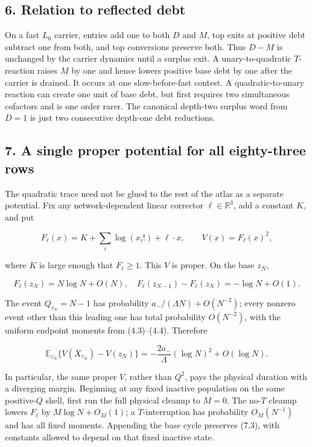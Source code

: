 \subsection{6. Relation to reflected
debt}

On a fast \(L_0\) carrier, entries add one to both \(D\) and \(M\), top
exits at positive debt subtract one from both, and top conversions
preserve both. Thus \(D-M\) is unchanged by the carrier dynamics until a
surplus exit. A unary-to-quadratic \(T\)-reaction raises \(M\) by one
and hence lowers positive base debt by one after the carrier is drained.
It occurs at one slow-before-fast contest. A quadratic-to-unary reaction
can create one unit of base debt, but first requires two simultaneous
cofactors and is one order rarer. The canonical depth-two surplus word
from \(D=1\) is just two consecutive depth-one debt reductions.

\subsection{7. A single proper potential for all eighty-three
rows}

The quadratic trace need not be glued to the rest of the atlas as a
separate potential. Fix any network-dependent linear corrector
\(\ell\in\mathbb R^3\), add a constant \(K\), and put

\[
 F_\ell(x)=K+\sum_i\log(x_i!)+\ell\cdot x,\qquad
 V(x)=F_\ell(x)^2,                                   \tag{7.1}
\]

where \(K\) is large enough that \(F_\ell\geq1\). This \(V\) is proper.
On the base \(z_N\),

\[
 F_\ell(z_N)=N\log N+O(N),\quad
 F_\ell(z_{N-1})-F_\ell(z_N)=-\log N+O(1).           \tag{7.2}
\]

The event \(Q_{\tau_N}=N-1\) has probability
\(a_-/(\Lambda N)+O(N^{-2})\); every nonzero event other than this
leading one has total probability \(O(N^{-2})\), with the uniform
endpoint moments from (4.3)--(4.4). Therefore

\[
 \mathbb E_{z_N}\{V(X_{\tau_N})-V(z_N)\}
 =-\frac{2a_-}{\Lambda}(\log N)^2+O(\log N).         \tag{7.3}
\]

In particular, the same proper \(V\), rather than \(Q^2\), pays the
physical duration with a diverging margin. Beginning at any fixed
inactive population on the same positive-\(Q\) shell, first run the full
physical cleanup to \(M=0\). The no-\(T\) cleanup lowers \(F_\ell\) by
\(M\log N+O_M(1)\); a \(T\)-interruption has probability \(O_M(N^{-1})\)
and has all fixed moments. Appending the base cycle preserves (7.3),
with constants allowed to depend on that fixed inactive state.


